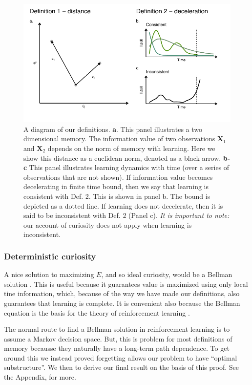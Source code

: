 \begin{figure}
	\begin{fullwidth}
	\includegraphics[width=0.7\linewidth]{img/cartoon.pdf} 
	\caption{A diagram of our definitions. 
	\textbf{a}. This panel illustrates a two dimensional memory. The information value of two observations $\mathbf{X}_1$ and $\mathbf{X}_2$ depends on the norm of memory with learning. Here we show this distance as a euclidean norm, denoted as a black arrow.
	\textbf{b-c} This panel illustrates learning dynamics with time (over a series of observations that are not shown). If information value becomes decelerating in finite time bound, then we say that learning is consistent with Def. 2. This is shown in panel b. The bound is depicted as a dotted line. If learning does not decelerate, then it is said to be inconsistent with Def. 2 (Panel c). \textit{It is important to note:} our account of curiosity does not apply when learning is inconsistent.
  	}
	\label{fig:cartoon} 
	\end{fullwidth}
\end{figure}

\subsubsection{Deterministic curiosity}
A nice solution to maximizing $E$, and so ideal curiosity, would be a Bellman solution \citep{Bellmann1954}. This is useful because it guarantees value is maximized using only local tine information, which, because of the way we have made our definitions, also guarantees that learning is complete. It is convenient also because the Bellman equation is the basis for the theory of reinforcement learning \citep{Sutton2018}. 

The normal route to find a Bellman solution in reinforcement learning is to assume a Markov decision space. But, this is problem for most definitions of memory becausse they naturally have a long-term path dependence. To get around this we instead proved forgetting allows our problem to have ``optimal substructure''. We then to derive our final result on the basis of this proof. See the Appendix, for more.

